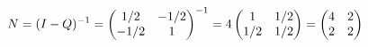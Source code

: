 \documentclass[preview]{standalone}
\begin{document}
\begin{align*}
\special{dvisvgm:raw <g id='unique000'>}N=(I-Q)^{-1}=\begin{pmatrix}1/2&-1/2\\-1/2&1\end{pmatrix}^{-1}=4\begin{pmatrix}1&1/2\\1/2&1/2\end{pmatrix}=\begin{pmatrix}4&2\\2&2\end{pmatrix}\special{dvisvgm:raw </g>}
\end{align*}
\end{document}
